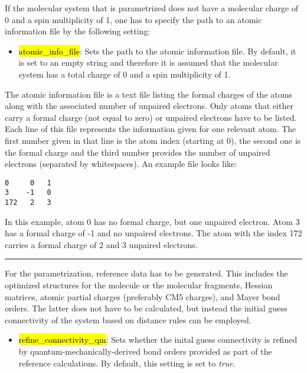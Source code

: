 \documentclass[]{tufte-book}
\begin{document}
If the molecular system that is parametrized does not have a molecular charge of 0 and a spin multiplicity of 1, one has to specify the path to an atomic information file by the following setting:

\begin{itemize}
\item \hl{atomic\_info\_file}: Sets the path to the atomic information file. By default, it is set to an empty string and therefore it is assumed that the molecular system has a total charge of 0 and a spin multiplicity of 1.
\end{itemize}

The atomic information file is a text file listing the formal charges of the atoms along with the associated number of unpaired electrons. Only atoms that either carry a formal charge (not equal to zero) or unpaired electrons have to be listed.
Each line of this file represents the information given for one relevant atom. The first number given in that line is the atom index (starting at 0), the second one is the formal charge and the third number provides the number of unpaired electrons (separated by whitespaces). An example file looks like:
\begin{mdframed}[backgroundcolor=LightSteelBlue!25, linewidth=0pt]
\begin{verbatim}
0     0   1
3    -1   0
172   2   3
\end{verbatim}
\end{mdframed}
In this example, atom 0 has no formal charge, but one unpaired electron. Atom 3 has a formal charge of -1 and no unpaired electrons. The atom with the index 172 carries a formal charge of 2 and 3 unpaired electrons.

\vspace{0.3cm}
\hrule
\vspace{0.3cm}

For the parametrization, reference data has to be generated. This includes the optimized structures for the molecule or the molecular fragments, Hessian matrices, atomic partial charges (preferably CM5 charges\cite{marenich12}), and Mayer bond orders\cite{mayer83}. The latter does not have to be calculated, but instead the initial guess connectivity of the system based on distance rules can be employed.

\begin{itemize}
\item \hl{refine\_connectivity\_qm}: Sets whether the inital guess connectivity is refined by quantum-mechanically-derived bond orders provided as part of the reference calculations. By default, this setting is set to \textit{true}.
\end{itemize}
\end{document}
